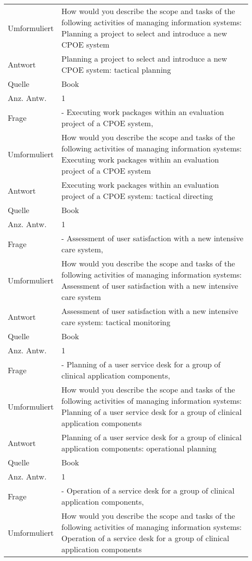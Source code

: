 \begin{landscape}
\begin{longtable}{p{3cm}p{}}
    Umformuliert & How would you describe the scope and tasks of the following activities of managing information systems: Planning a project to select and introduce a new CPOE system \\
    Antwort & Planning a project to select and introduce a new CPOE system: tactical planning \\
    Quelle & Book \\
    Anz. Antw.& 1 \\
    \midrule
    Frage & - Executing work packages within an evaluation project of a CPOE system, \\
    Umformuliert & How would you describe the scope and tasks of the following activities of managing information systems: Executing work packages within an evaluation project of a CPOE system \\
    Antwort & Executing work packages within an evaluation project of a CPOE system: tactical directing \\
    Quelle & Book \\
    Anz. Antw.& 1 \\
    \midrule
    Frage & - Assessment of user satisfaction with a new intensive care system, \\
    Umformuliert & How would you describe the scope and tasks of the following activities of managing information systems: Assessment of user satisfaction with a new intensive care system \\
    Antwort & Assessment of user satisfaction with a new intensive care system: tactical monitoring \\
    Quelle & Book \\
    Anz. Antw.& 1 \\
    \midrule
    Frage & - Planning of a user service desk for a group of clinical application components, \\
    Umformuliert & How would you describe the scope and tasks of the following activities of managing information systems: Planning of a user service desk for a group of clinical application components \\
    Antwort & Planning of a user service desk for a group of clinical application components: operational planning \\
    Quelle & Book \\
    Anz. Antw.& 1 \\
    \midrule
    Frage & - Operation of a service desk for a group of clinical application components, \\
    Umformuliert & How would you describe the scope and tasks of the following activities of managing information systems: Operation of a service desk for a group of clinical application components \\

\end{longtable}
\end{landscape}
